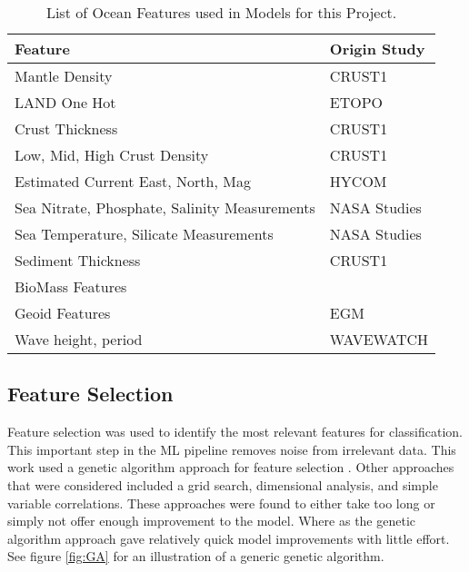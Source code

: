 %

\begin{table}[htb]
    \centering
    \begin{tabular}{ |p{} p{}| }
        \hline
            \textbf{Feature} & \textbf{Origin Study} \\
            \hline
            Mantle Density & CRUST1 \cite{laske2013update} \\
            LAND One Hot & ETOPO \cite{national1988etopo} \\
            Crust Thickness & CRUST1 \cite{laske2013update} \\
            Low, Mid, High Crust Density & CRUST1 \cite{laske2013update} \\
            Estimated Current East, North, Mag & HYCOM \cite{chassignet2009us} \\
            Sea Nitrate, Phosphate, Salinity Measurements & NASA Studies \cite{meissner2018salinity} \cite{parekh2005decoupling}  \\
            Sea Temperature, Silicate Measurements & NASA Studies \\
            Sediment Thickness & CRUST1 \cite{laske2013update} \\
            BioMass Features & \cite{wei2010global} \\
            Geoid Features & EGM \cite{pavlis2008earth} \\
            Wave height, period & WAVEWATCH \cite{tolman20072007} \\
        \hline
    \end{tabular}
    \label{table:FEATURE_LIST}
    \caption{List of Ocean Features used in Models for this Project.}
\end{table}
\subsection{Feature Selection}
Feature selection was used to identify the most relevant features for classification.
This important step in the \ac{ML} pipeline removes noise from irrelevant data.
This work used a genetic algorithm approach for feature selection \cite{yang1998feature}.
Other approaches that were considered included a grid search, dimensional analysis, and simple variable correlations.
These approaches were found to either take too long or simply not offer enough improvement to the model.
Where as the genetic algorithm approach gave relatively quick model improvements with little effort.
See figure \ref{fig:GA} for an illustration of a generic genetic algorithm.

